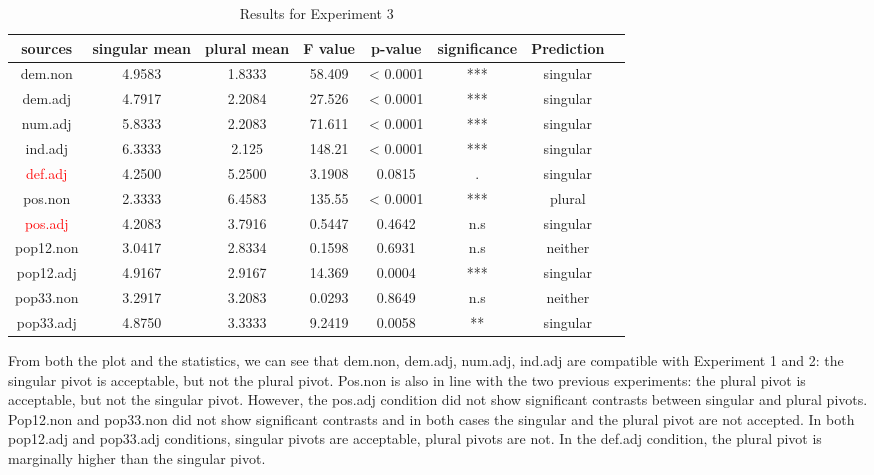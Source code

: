 \documentclass[
  11pt          %
  ,letterpaper  %
  ,center       %
  ,noupper      %
  ]{uconnthesis2}
\begin{document}
\begin{table}[htb!] \small \centering
\resizebox{0.8\textwidth}{!}
{
\begin{tabular}{ | c | c | c | c | c | c | c | c |} \hline 
sources		&	singular mean	&	plural mean	&	F value	&	p-value 		&	significance	&	Prediction \\ \hline
dem.non		&	4.9583		&	1.8333		&	58.409	&	< 0.0001		&	***			&	singular \\ \hline
dem.adj		&	4.7917		&	2.2084		&	27.526 	&	< 0.0001		&	***			&	singular \\ \hline
num.adj		&	5.8333		&	2.2083		&	71.611 	&	< 0.0001		&	***			&	singular\\ \hline
ind.adj		&	6.3333		&	2.125		&	148.21	&	< 0.0001		&	***			&	singular \\ \hline
\textcolor{red}{def.adj}		&	4.2500		&	5.2500		&	3.1908	&	0.0815	&	.	&	singular \\ \hline
pos.non		&	2.3333		&	6.4583		&	135.55	&	< 0.0001		&	***			&	plural \\ \hline
\textcolor{red}{pos.adj}		&	4.2083 		&	3.7916		&	0.5447	&	0.4642		&	n.s			&	singular \\ \hline
pop12.non	&	3.0417		&	2.8334 		&	0.1598 	&	0.6931		&	n.s			&	neither \\ \hline
pop12.adj		&	4.9167		&	2.9167		&	14.369	&	0.0004		&	***			&	singular \\ \hline
pop33.non	&	3.2917		&	3.2083		&	0.0293 	&	0.8649		&	n.s			&	neither \\ \hline
pop33.adj		&	4.8750		&	3.3333		&	9.2419	&	0.0058 		&	**			&	singular \\ \hline
\end{tabular}}
\caption{Results for Experiment 3} \label{tab:ch3exp3a}
\end{table} 

From both the plot and the statistics, we can see that dem.non, dem.adj, num.adj, ind.adj are compatible with Experiment 1 and 2: the singular pivot is acceptable, but not the plural pivot. Pos.non is also in line with the two previous experiments: the plural pivot is acceptable, but not the singular pivot. However, the pos.adj condition did not show significant contrasts between singular and plural pivots. Pop12.non and pop33.non did not show significant contrasts and in both cases the singular and the plural pivot are not accepted. In both pop12.adj and pop33.adj conditions, singular pivots are acceptable, plural pivots are not. In the def.adj condition, the plural pivot is marginally higher than the singular pivot. 
\end{document}
